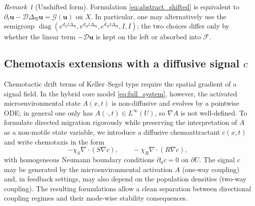 \documentclass[pdflatex,sn-mathphys-ay]{sn-jnl}
\theoremstyle{thmstyleone}
\theoremstyle{definition}
\theoremstyle{remark}
\newtheorem{remark}[theorem]{Remark}
\begin{document}
\begin{remark}[Unshifted form]\label{rem:unshifted_equiv}
Formulation \eqref{eq:abstract_shifted} is equivalent to
$\partial_t\mathbf u-\mathcal D\Delta_{\mathfrak N}\mathbf u=\mathcal G(\mathbf u)$ on $X$.
In particular, one may alternatively use the semigroup
$\operatorname{diag}(e^{d_S t\Delta_{\mathfrak N}},e^{d_R t\Delta_{\mathfrak N}},e^{d_D t\Delta_{\mathfrak N}},I,I)$;
the two choices differ only by whether the linear term $-\mathcal D\mathbf u$ is kept on the left
or absorbed into $\mathcal F$.
\end{remark}

\subsection{Chemotaxis extensions with a diffusive signal $c$}
\label{subsec:chemotaxis_extensions_overview}

Chemotactic drift terms of Keller--Segel type require the spatial gradient of a signal field.
In the hybrid core model \eqref{eq:full_system}, however, the activated microenvironmental state $A(x,t)$ is non-diffusive
and evolves by a pointwise ODE; in general one only has $A(\cdot,t)\in L^\infty(U)$, so $\nabla A$ is not well-defined.
To formulate directed migration rigorously while preserving the interpretation of $A$ as a non-motile state variable, we
introduce a diffusive chemoattractant $c(x,t)$ and write chemotaxis in the form
\[
-\chi_S\nabla\cdot(S\nabla c),\qquad -\chi_R\nabla\cdot(R\nabla c),
\]
with homogeneous Neumann boundary conditions $\partial_{\mathrm n}c=0$ on $\partial U$.
The signal $c$ may be generated by the microenvironmental activation $A$ (one-way coupling) and, in feedback settings, may also
depend on the population densities (two-way coupling). The resulting formulations allow a clean separation between
directional coupling regimes and their mode-wise stability consequences.
\end{document}
